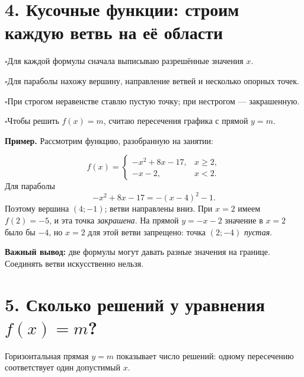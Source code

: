 \documentclass[a4paper,12pt]{article}
\newcommand{\checkline}[1]{\par\noindent\textcolor{accent}{$\square$}\hspace{5pt}#1\par}
\newcommand{\ex}[1]{\par\smallskip\textcolor{darkaccent}{\textbf{Пример.}} #1\par}
\begin{document}
\clearpage
\section*{4. Кусочные функции: строим каждую ветвь на её области}
\checkline{Для каждой формулы сначала выписываю разрешённые значения $x$.}
\checkline{Для параболы нахожу вершину, направление ветвей и несколько опорных точек.}
\checkline{При строгом неравенстве ставлю пустую точку; при нестрогом --- закрашенную.}
\checkline{Чтобы решить $f(x)=m$, считаю пересечения графика с прямой $y=m$.}

\ex{Рассмотрим функцию, разобранную на занятии:}
\[
f(x)=\begin{cases}
-x^2+8x-17,&x\ge2,\\
-x-2,&x<2.
\end{cases}
\]
Для параболы
\[
-x^2+8x-17=-(x-4)^2-1.
\]
Поэтому вершина $(4;-1)$; ветви направлены вниз. При $x=2$ имеем $f(2)=-5$, и эта точка \emph{закрашена}. На прямой $y=-x-2$ значение в $x=2$ было бы $-4$, но $x=2$ для этой ветви запрещено: точка $(2;-4)$ \emph{пустая}.

\begin{center}
\end{center}

\textbf{Важный вывод:} две формулы могут давать разные значения на границе. Соединять ветви искусственно нельзя.

\clearpage
\section*{5. Сколько решений у уравнения $f(x)=m$?}
Горизонтальная прямая $y=m$ показывает число решений: одному пересечению соответствует один допустимый $x$.
\end{document}

